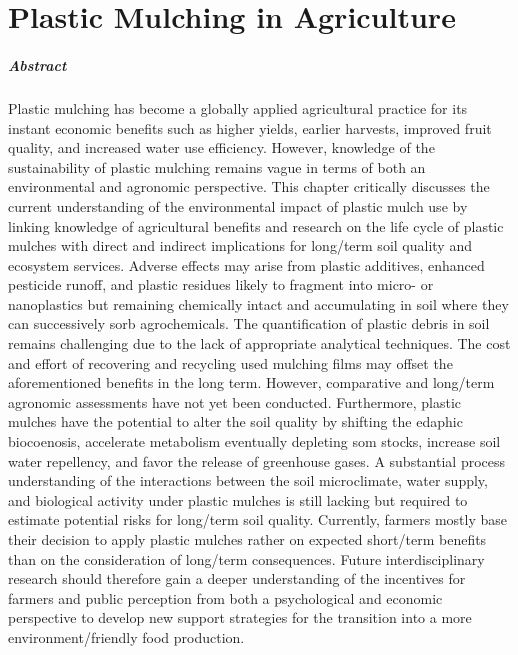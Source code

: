 
\chapter{Plastic Mulching in Agriculture}
\label{ch:plastic-mulching}

\paragraph{Abstract} Plastic mulching has become a globally applied agricultural practice for its instant economic benefits such as higher yields, earlier harvests, improved fruit quality, and increased water use efficiency. However, knowledge of the sustainability of plastic mulching remains vague in terms of both an environmental and agronomic perspective. This chapter critically discusses the current understanding of the environmental impact of plastic mulch use by linking knowledge of agricultural benefits and research on the life cycle of plastic mulches with direct and indirect implications for long\-/term soil quality and ecosystem services. Adverse effects may arise from plastic additives, enhanced pesticide runoff, and plastic residues likely to fragment into micro- or nanoplastics but remaining chemically intact and accumulating in soil where they can successively sorb agrochemicals. The quantification of plastic debris in soil remains challenging due to the lack of appropriate analytical techniques. The cost and effort of recovering and recycling used mulching films may offset the aforementioned benefits in the long term. However, comparative and long\-/term agronomic assessments have not yet been conducted. Furthermore, plastic mulches have the potential to alter the soil quality by shifting the edaphic biocoenosis, accelerate  metabolism eventually depleting \ac{som} stocks, increase soil water repellency, and favor the release of greenhouse gases. A substantial process understanding of the interactions between the soil microclimate, water supply, and biological activity under plastic mulches is still lacking but required to estimate potential risks for long\-/term soil quality. Currently, farmers mostly base their decision to apply plastic mulches rather on expected short\-/term benefits than on the consideration of long\-/term consequences. Future interdisciplinary research should therefore gain a deeper understanding of the incentives for farmers and public perception from both a psychological and economic perspective to develop new support strategies for the transition into a more environment\-/friendly food production.

